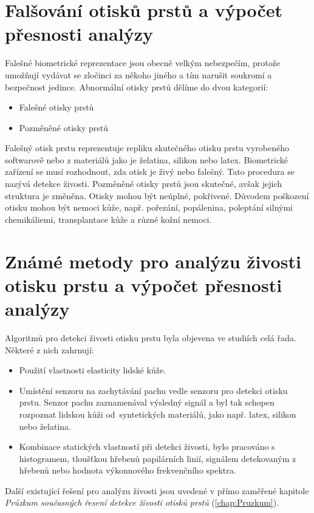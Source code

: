 \section{Falšování otisků prstů a výpočet přesnosti analýzy}
Falešné biometrické reprezentace jsou obecně velkým nebezpečím, protože umožňují vydávat se zločinci za někoho jiného a tím narušit soukromí a bezpečnost jedince. Abnormální otisky prstů dělíme do dvou kategorií:
\begin{itemize}
    \item Falešné otisky prstů
    \item Pozměněné otisky prstů
\end{itemize}
Falešný otisk prstu reprezentuje repliku skutečného otisku prstu vyrobeného softwarově nebo z materiálů jako je želatina, silikon nebo latex. Biometrické zařízení se musí rozhodnout, zda otisk je živý nebo falešný. Tato procedura se nazývá detekce živosti.
Pozměněné otisky prstů jsou skutečné, avšak jejich struktura je změněna. Otisky mohou být neúplné, pokřivené. Důvodem poškození otisku mohou být nemoci kůže, např. pořezání, popálenina, poleptání silnými chemikáliemi, transplantace kůže a různé kožní nemoci. \cite{Petrovici}
\section{Známé metody pro analýzu živosti otisku prstu a výpočet přesnosti analýzy}
Algoritmů pro detekci živosti otisku prstu byla objevena ve studiích celá řada. Některé z nich zahrnují: \cite{AbhiskekStudy}
\begin{itemize}
    \item Použití vlastnosti elasticity lidské kůže.
    \item Umístění senzoru na zachytávání pachu vedle senzoru pro detekci otisku prstu. Senzor pachu zaznamenával výsledný signál a byl tak schopen rozpoznat lidskou kůži od~syntetických materiálů, jako např. latex, silikon nebo želatina.
    \item Kombinace statických vlastností při detekci živosti, bylo pracováno s histogramem, tloušťkou hřebenů papilárních linií, signálem detekovaným z hřebenů nebo hodnota výkonnového frekvenčního spektra.
    
\end{itemize}

Další existující řešení pro analýzu živosti jsou uvedené v přímo zaměřené kapitole \textit{Průzkum současných řesení detekce živosti otisků prstů} (\autoref{chap:Pruzkum}).


